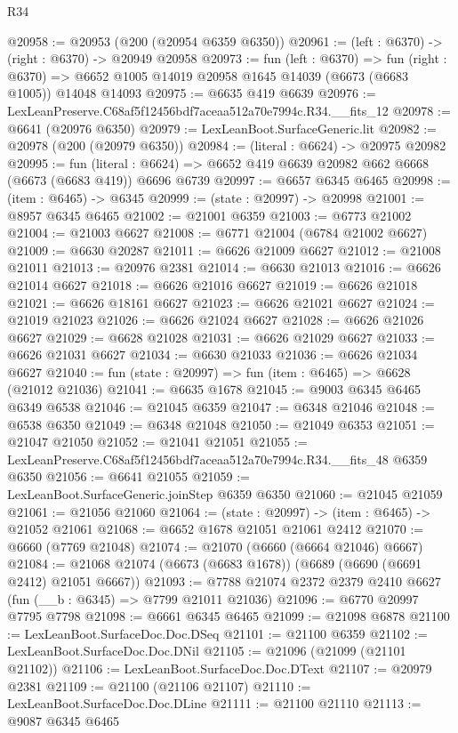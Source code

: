 \begin{lexlean}{R34}
\begin{coremodule}
@20958 := @20953 (@200 (@20954 @6359 @6350))
@20961 := (left : @6370) -> (right : @6370) -> @20949 @20958
@20973 := fun (left : @6370) =>
  fun (right : @6370) => @6652 @1005 @14019 @20958 @1645 @14039 (@6673 (@6683 @1005)) @14048 @14093
@20975 := @6635 @419 @6639
@20976 := LexLeanPreserve.C68af5f12456bdf7aceaa512a70e7994c.R34.__fits_12
@20978 := @6641 (@20976 @6350)
@20979 := LexLeanBoot.SurfaceGeneric.lit
@20982 := @20978 (@200 (@20979 @6350))
@20984 := (literal : @6624) -> @20975 @20982
@20995 := fun (literal : @6624) =>
  @6652 @419 @6639 @20982 @662 @6668 (@6673 (@6683 @419)) @6696 @6739
@20997 := @6657 @6345 @6465
@20998 := (item : @6465) -> @6345
@20999 := (state : @20997) -> @20998
@21001 := @8957 @6345 @6465
@21002 := @21001 @6359
@21003 := @6773 @21002
@21004 := @21003 @6627
@21008 := @6771 @21004 (@6784 @21002 @6627)
@21009 := @6630 @20287
@21011 := @6626 @21009 @6627
@21012 := @21008 @21011
@21013 := @20976 @2381
@21014 := @6630 @21013
@21016 := @6626 @21014 @6627
@21018 := @6626 @21016 @6627
@21019 := @6626 @21018
@21021 := @6626 @18161 @6627
@21023 := @6626 @21021 @6627
@21024 := @21019 @21023
@21026 := @6626 @21024 @6627
@21028 := @6626 @21026 @6627
@21029 := @6628 @21028
@21031 := @6626 @21029 @6627
@21033 := @6626 @21031 @6627
@21034 := @6630 @21033
@21036 := @6626 @21034 @6627
@21040 := fun (state : @20997) => fun (item : @6465) => @6628 (@21012 @21036)
@21041 := @6635 @1678
@21045 := @9003 @6345 @6465 @6349 @6538
@21046 := @21045 @6359
@21047 := @6348 @21046
@21048 := @6538 @6350
@21049 := @6348 @21048
@21050 := @21049 @6353
@21051 := @21047 @21050
@21052 := @21041 @21051
@21055 := LexLeanPreserve.C68af5f12456bdf7aceaa512a70e7994c.R34.__fits_48 @6359 @6350
@21056 := @6641 @21055
@21059 := LexLeanBoot.SurfaceGeneric.joinStep @6359 @6350
@21060 := @21045 @21059
@21061 := @21056 @21060
@21064 := (state : @20997) -> (item : @6465) -> @21052 @21061
@21068 := @6652 @1678 @21051 @21061 @2412
@21070 := @6660 (@7769 @21048)
@21074 := @21070 (@6660 (@6664 @21046) @6667)
@21084 := @21068 @21074 (@6673 (@6683 @1678)) (@6689 (@6690 (@6691 @2412) @21051 @6667))
@21093 := @7788 @21074 @2372 @2379 @2410 @6627 (fun (__b : @6345) => @7799 @21011 @21036)
@21096 := @6770 @20997 @7795 @7798
@21098 := @6661 @6345 @6465
@21099 := @21098 @6878
@21100 := LexLeanBoot.SurfaceDoc.Doc.DSeq
@21101 := @21100 @6359
@21102 := LexLeanBoot.SurfaceDoc.Doc.DNil
@21105 := @21096 (@21099 (@21101 @21102))
@21106 := LexLeanBoot.SurfaceDoc.Doc.DText
@21107 := @20979 @2381
@21109 := @21100 (@21106 @21107)
@21110 := LexLeanBoot.SurfaceDoc.Doc.DLine
@21111 := @21100 @21110
@21113 := @9087 @6345 @6465

\end{coremodule}
\end{lexlean}
